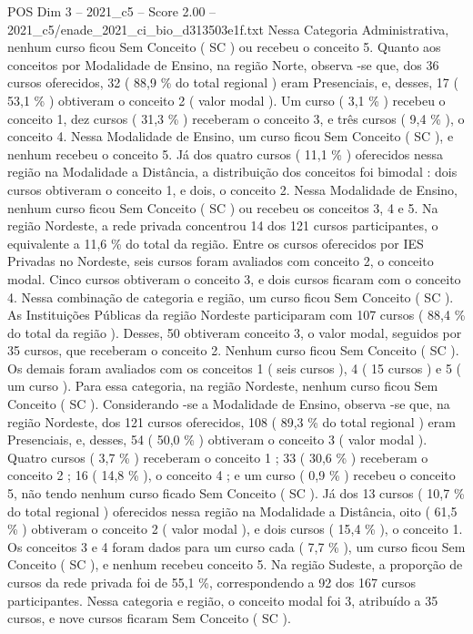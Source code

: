 \begin{textsample}{POS Dim 3 – 2021\_c5 – Score 2.00 – 2021\_c5/enade\_2021\_ci\_bio\_d313503e1f.txt}
Nessa Categoria Administrativa, nenhum curso ficou Sem Conceito ( SC ) ou recebeu o conceito 5.
Quanto aos conceitos por Modalidade de Ensino, na região Norte, observa -se que, dos 36 cursos oferecidos, 32 ( 88,9 \% do total regional ) eram Presenciais, e, desses, 17 ( 53,1 \% ) obtiveram o conceito 2 ( valor modal ).
Um curso ( 3,1 \% ) recebeu o conceito 1, dez cursos ( 31,3 \% ) receberam o conceito 3, e três cursos ( 9,4 \% ), o conceito 4.
Nessa Modalidade de Ensino, um curso ficou Sem Conceito ( SC ), e nenhum recebeu o conceito 5.
Já dos quatro cursos ( 11,1 \% ) oferecidos nessa região na Modalidade a Distância, a distribuição dos conceitos foi bimodal : dois cursos obtiveram o conceito 1, e dois, o conceito 2.
Nessa Modalidade de Ensino, nenhum curso ficou Sem Conceito ( SC ) ou recebeu os conceitos 3, 4 e 5.
Na região Nordeste, a rede privada concentrou 14 dos 121 cursos participantes, o equivalente a 11,6 \% do total da região.
Entre os cursos oferecidos por IES Privadas no Nordeste, seis cursos foram avaliados com conceito 2, o conceito modal.
Cinco cursos obtiveram o conceito 3, e dois cursos ficaram com o conceito 4.
Nessa combinação de categoria e região, um curso ficou Sem Conceito ( SC ).
As Instituições Públicas da região Nordeste participaram com 107 cursos ( 88,4 \% do total da região ).
Desses, 50 obtiveram conceito 3, o valor modal, seguidos por 35 cursos, que receberam o conceito 2.
Nenhum curso ficou Sem Conceito ( SC ).
Os demais foram avaliados com os conceitos 1 ( seis cursos ), 4 ( 15 cursos ) e 5 ( um curso ).
Para essa categoria, na região Nordeste, nenhum curso ficou Sem Conceito ( SC ).
Considerando -se a Modalidade de Ensino, observa -se que, na região Nordeste, dos 121 cursos oferecidos, 108 ( 89,3 \% do total regional ) eram Presenciais, e, desses, 54 ( 50,0 \% ) obtiveram o conceito 3 ( valor modal ).
Quatro cursos ( 3,7 \% ) receberam o conceito 1 ; 33 ( 30,6 \% ) receberam o conceito 2 ; 16 ( 14,8 \% ), o conceito 4 ; e um curso ( 0,9 \% ) recebeu o conceito 5, não tendo nenhum curso ficado Sem Conceito ( SC ).
Já dos 13 cursos ( 10,7 \% do total regional ) oferecidos nessa região na Modalidade a Distância, oito ( 61,5 \% ) obtiveram o conceito 2 ( valor modal ), e dois cursos ( 15,4 \% ), o conceito 1.
Os conceitos 3 e 4 foram dados para um curso cada ( 7,7 \% ), um curso ficou Sem Conceito ( SC ), e nenhum recebeu conceito 5.
Na região Sudeste, a proporção de cursos da rede privada foi de 55,1 \%, correspondendo a 92 dos 167 cursos participantes.
Nessa categoria e região, o conceito modal foi 3, atribuído a 35 cursos, e nove cursos ficaram Sem Conceito ( SC ).

\end{textsample}
